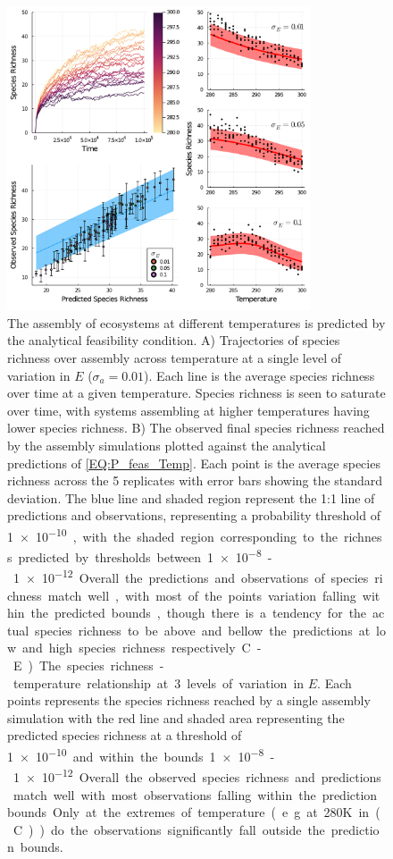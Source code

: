 \documentclass{article}
\begin{document}
\begin{figure}
    \centering
    \includegraphics[width = 0.8\textwidth]{docs/Figures/Fig_4.pdf}
    \caption{The assembly of ecosystems at different temperatures is predicted by the analytical feasibility condition. A) Trajectories of species richness over assembly across temperature at a single level of variation in $E$ ($\sigma_a = 0.01$). Each line is the average species richness over time at a given temperature. Species richness is seen to saturate over time, with systems assembling at higher temperatures having lower species richness. B) The observed final species richness reached by the assembly simulations plotted against the analytical predictions of \cref{EQ:P_feas_Temp}. Each point is the average species richness across the 5 replicates with error bars showing the standard deviation. The blue line and shaded region represent the 1:1 line of predictions and observations, representing a probability threshold of \SI{1e-10}, with the shaded region corresponding to the richness predicted by thresholds between \SI{1e-8}-\SI{1e-12}. Overall the predictions and observations of species richness match well, with most of the points variation falling within the predicted bounds, though there is a tendency for the actual species richness to be above and bellow the predictions at low and high species richness respectively. C-E) The species richness - temperature relationship at 3 levels of variation in $E$. Each points represents the species richness reached by a single assembly simulation with the red line and shaded area representing the predicted species richness at a threshold of \SI{1e-10} and within the bounds \SI{1e-8}-\SI{1e-12}. Overall the observed species richness and predictions match well with most observations falling within the prediction bounds. Only at the extremes of temperature (e.g. at 280K in (C)) do the observations significantly fall outside the prediction bounds.}
    \label{Fig:Temperature_assembly}
\end{figure}
\end{document}
